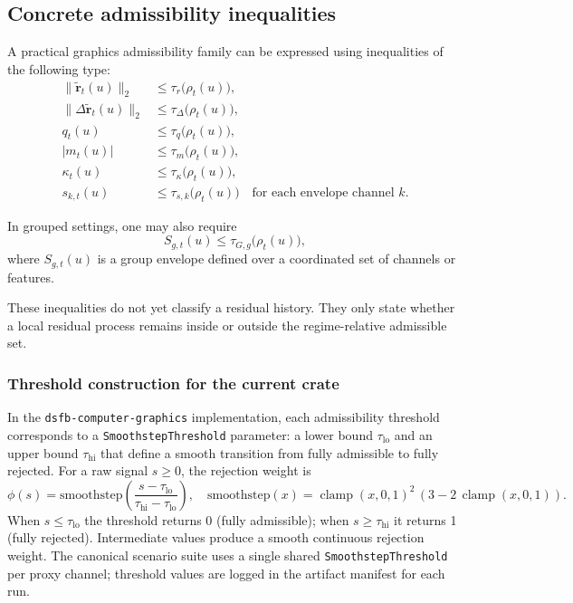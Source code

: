 \documentclass[11pt]{article}
\theoremstyle{definition}
\theoremstyle{plain}
\begin{document}

\subsection{Concrete admissibility inequalities}

A practical graphics admissibility family can be expressed using inequalities of the following type:
\begin{align}
\|\tilde{\mathbf r}_t(u)\|_2 &\le \tau_r\bigl(\rho_t(u)\bigr), \\
\|\Delta \tilde{\mathbf r}_t(u)\|_2 &\le \tau_\Delta\bigl(\rho_t(u)\bigr), \\
q_t(u) &\le \tau_q\bigl(\rho_t(u)\bigr), \\
|m_t(u)| &\le \tau_m\bigl(\rho_t(u)\bigr), \\
\kappa_t(u) &\le \tau_\kappa\bigl(\rho_t(u)\bigr), \\
s_{k,t}(u) &\le \tau_{s,k}\bigl(\rho_t(u)\bigr)\quad \text{for each envelope channel }k.
\end{align}

In grouped settings, one may also require
\begin{equation}
S_{g,t}(u)\le \tau_{G,g}\bigl(\rho_t(u)\bigr),
\end{equation}
where $S_{g,t}(u)$ is a group envelope defined over a coordinated set of channels or features.

These inequalities do not yet classify a residual history. They only state whether a local residual process remains inside or outside the regime-relative admissible set.

\subsubsection{Threshold construction for the current crate}
\label{sec:threshold-construction}

In the \texttt{dsfb-computer-graphics} implementation, each admissibility threshold corresponds to a \texttt{SmoothstepThreshold} parameter: a lower bound $\tau_{\mathrm{lo}}$ and an upper bound $\tau_{\mathrm{hi}}$ that define a smooth transition from fully admissible to fully rejected. For a raw signal $s \ge 0$, the rejection weight is
\begin{equation}
\phi(s) = \mathrm{smoothstep}\!\left(\frac{s - \tau_{\mathrm{lo}}}{\tau_{\mathrm{hi}} - \tau_{\mathrm{lo}}}\right), \quad
\mathrm{smoothstep}(x) = \operatorname{clamp}(x,0,1)^2\,(3 - 2\,\operatorname{clamp}(x,0,1)).
\end{equation}
When $s \le \tau_{\mathrm{lo}}$ the threshold returns 0 (fully admissible); when $s \ge \tau_{\mathrm{hi}}$ it returns 1 (fully rejected). Intermediate values produce a smooth continuous rejection weight. The canonical scenario suite uses a single shared \texttt{SmoothstepThreshold} per proxy channel; threshold values are logged in the artifact manifest for each run.
\end{document}
